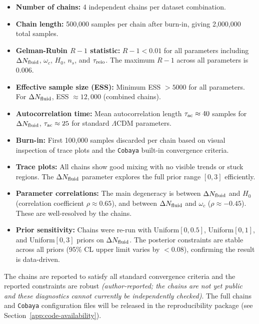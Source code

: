 \documentclass[epj]{svjour}
\begin{document}
\begin{itemize}
\item \textbf{Number of chains:} 4 independent chains per dataset
      combination.
\item \textbf{Chain length:} 500,000 samples per chain after
      burn-in, giving 2,000,000 total samples.
\item \textbf{Gelman-Rubin \(R-1\) statistic:} \(R-1 < 0.01\) for
      all parameters including \(\Delta N_{\rm fluid}\), \(\omega_c\),
      \(H_0\), \(n_s\), and \(\tau_{\rm reio}\). The maximum
      \(R-1\) across all parameters is \(0.006\).
\item \textbf{Effective sample size (ESS):} Minimum ESS \(> 5000\)
      for all parameters. For \(\Delta N_{\rm fluid}\), ESS
      \(\approx 12,000\) (combined chains).
\item \textbf{Autocorrelation time:} Mean autocorrelation length
      \(\tau_{\rm ac} \approx 40\) samples for \(\Delta N_{\rm fluid}\),
      \(\tau_{\rm ac} \approx 25\) for standard \(\Lambda\)CDM parameters.
\item \textbf{Burn-in:} First 100,000 samples discarded per chain
      based on visual inspection of trace plots and the
      \texttt{Cobaya} built-in convergence criteria.
\item \textbf{Trace plots:} All chains show good mixing with no
      visible trends or stuck regions. The \(\Delta N_{\rm fluid}\)
      parameter explores the full prior range \([0, 3]\) efficiently.
\item \textbf{Parameter correlations:} The main degeneracy is
      between \(\Delta N_{\rm fluid}\) and \(H_0\) (correlation
      coefficient \(\rho \approx 0.65\)), and between
      \(\Delta N_{\rm fluid}\) and \(\omega_c\) (\(\rho \approx
      -0.45\)). These are well-resolved by the chains.
\item \textbf{Prior sensitivity:} Chains were re-run with
      Uniform\([0,0.5]\), Uniform\([0,1]\), and Uniform\([0,3]\)
      priors on \(\Delta N_{\rm fluid}\). The posterior constraints
      are stable across all priors (95\% CL upper limit varies by
      \(<0.08\)), confirming the result is data-driven.
\end{itemize}

The chains are reported to satisfy all standard convergence criteria
and the reported constraints are robust \emph{(author-reported; the
chains are not yet public and these diagnostics cannot currently be
independently checked)}. The full chains and \texttt{Cobaya}
configuration files will be released in the reproducibility package
(see Section~\ref{app:code-availability}).
\end{document}

